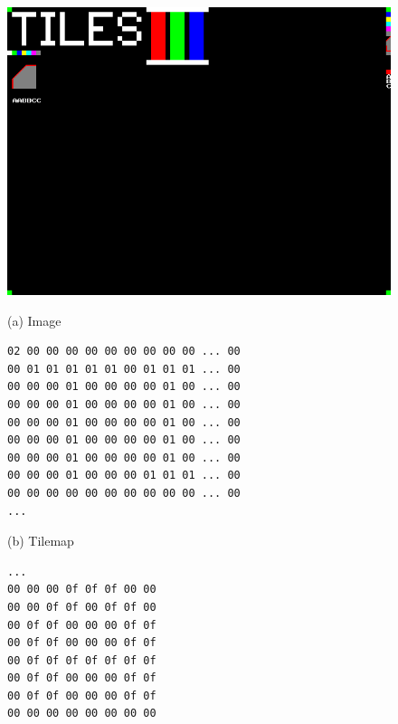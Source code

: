 \documentclass[11pt]{article}
\begin{document}
\begin{figure}
  \begin{minipage}[b]{0.3\textwidth}
    \centerline{\includegraphics[width=1\textwidth]{tiles1.png}}
    
    \centerline{(a) Image}
  \end{minipage}\hfill
  \begin{minipage}[b]{0.29\textwidth}   
{\datasize\begin{verbatim}
02 00 00 00 00 00 00 00 00 00 ... 00
00 01 01 01 01 01 00 01 01 01 ... 00
00 00 00 01 00 00 00 00 01 00 ... 00
00 00 00 01 00 00 00 00 01 00 ... 00
00 00 00 01 00 00 00 00 01 00 ... 00
00 00 00 01 00 00 00 00 01 00 ... 00
00 00 00 01 00 00 00 00 01 00 ... 00
00 00 00 01 00 00 00 01 01 01 ... 00
00 00 00 00 00 00 00 00 00 00 ... 00
...
\end{verbatim}}

  \vspace{-1\baselineskip}
  \centerline{(b) Tilemap}
  
  \end{minipage}\hfill
  \begin{minipage}[b]{0.22\textwidth}  
{\datasize
\begin{verbatim}
...
00 00 00 0f 0f 0f 00 00
00 00 0f 0f 00 0f 0f 00
00 0f 0f 00 00 00 0f 0f
00 0f 0f 00 00 00 0f 0f
00 0f 0f 0f 0f 0f 0f 0f
00 0f 0f 00 00 00 0f 0f
00 0f 0f 00 00 00 0f 0f
00 00 00 00 00 00 00 00


\end{verbatim}}
\end{minipage}
\end{figure}
\end{document}

